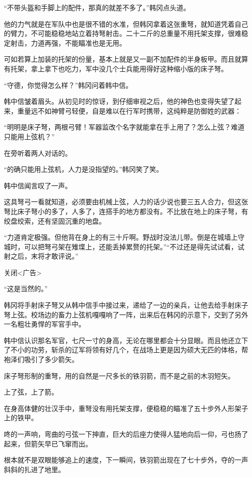 “不带头盔和手脚上的配件，那真的就差不多了。”韩冈点头道。

他的力气就是在军队中也是很不错的水准，但韩冈拿着这张重弩，就知道凭着自己的臂力，不可能稳稳地站立着持弩射击。二十二斤的总重量不用托架支撑，很难稳定射击，力道再强，不能瞄准也是无用。

可如若算上加装的托架的份量，基本上就是又一副不加配件的半身板甲。而且就算有托架，拿上拿下也吃力，军中没几个士兵能用得好这种缩小版的床子弩。

“守德，你觉得怎么样？”韩冈问着韩中信。

韩中信皱着眉头。从初见时的惊讶，到仔细审视之后，他的神色也变得失望了起来，重量远不如神臂弓轻便，自是难以在行军时携带，这纯粹是防御姓的武器：

“明明是床子弩，两根弓臂！军器监改个名字就能拿在手上用了？怎么上弦？难道只能用上弦机？”

在旁听着两人对话的。

“的确只能用上弦机，人力是没指望的。”韩冈笑了笑。

韩中信闻言叹了一声。

这具弩弓一看就知道，必须要由机械上弦，人力的话少说也要三五人合力，但这张弩比床子弩小的多了，人多了，连搭手的地方都没有。不比放在地上的床子弩，有绞盘绞索，还有坚固沉重的地盘。

“力道肯定极强。但他背在身上的有三十斤啊。野战时没法儿带。倒是在城墙上守城时，可以把弩弓架在雉堞上，还能丢掉累赘的托架。”“不过还是得先试试看，试射之后，末将才敢评说。”

关闭<广告>

“这是当然的。”

韩冈将手射床子弩又从韩中信手中接过来，递给了一边的亲兵，让他去给手射床子弩上弦。校场边的畜力上弦机嘎嘎响了一阵，出来后在韩冈的示意下，交到了另外一名粗壮勇悍的军官手中。

韩中信认识那名军官，七尺一寸的身高，无论在哪里都会十分显眼。而且他还立下了不小的功劳，斩杀的辽军将领有好几个，在战场上更是因为硕大无匹的体格，帮袍泽们吸引了多少箭矢。

床子弩形制的重弩，用的自然是一尺多长的铁羽箭，而不是之前的木羽短矢。

上了弦，上了箭。

在身高体健的壮汉手中，重弩没有用托架支撑，便稳稳的瞄准了五十步外人形架子上的铁甲。

咚的一声响，弯曲的弓弦一下抻直，巨大的后座力使得人猛地向后一仰，弓也扬了起来，但箭矢早已飞窜而出。

根本就不是双眼能够追上的速度，下一瞬间，铁羽箭出现在了七十步外，夺的一声斜斜的扎进了地里。

